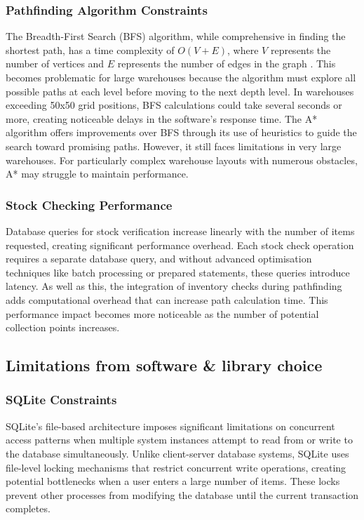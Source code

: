 \subsubsection{Pathfinding Algorithm Constraints}
The Breadth-First Search (BFS) algorithm, while comprehensive in finding the shortest path, has a time complexity of \( O(V + E) \), where \( V \) represents the number of vertices and \( E \) represents the number of edges in the graph \cite{bfs_time}. This becomes problematic for large warehouses because the algorithm must explore all possible paths at each level before moving to the next depth level. In warehouses exceeding 50x50 grid positions, BFS calculations could take several seconds or more, creating noticeable delays in the software's response time. The A* algorithm offers improvements over BFS through its use of heuristics to guide the search toward promising paths. However, it still faces limitations in very large warehouses. For particularly complex warehouse layouts with numerous obstacles, A* may struggle to maintain performance.


\subsubsection{Stock Checking Performance}
Database queries for stock verification increase linearly with the number of items requested, creating significant performance overhead. Each stock check operation requires a separate database query, and without advanced optimisation techniques like batch processing or prepared statements, these queries introduce latency. As well as this, the integration of inventory checks during pathfinding adds computational overhead that can increase path calculation time. This performance impact becomes more noticeable as the number of potential collection points increases.

\subsection{Limitations from software \& library choice}

\subsubsection{SQLite Constraints}
SQLite's file-based architecture imposes significant limitations on concurrent access patterns when multiple system instances attempt to read from or write to the database simultaneously. Unlike client-server database systems, SQLite uses file-level locking mechanisms \cite{sqlite_locking_v3} that restrict concurrent write operations, creating potential bottlenecks when a user enters a large number of items. These locks prevent other processes from modifying the database until the current transaction completes.

